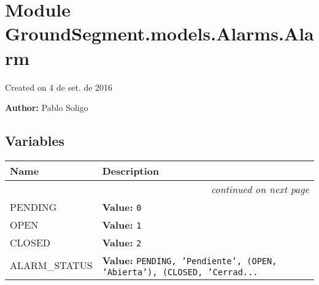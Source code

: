 %
%
%


\section{Module GroundSegment.models.Alarms.Alarm}

    \label{GroundSegment:models:Alarms:Alarm}
Created on 4 de set. de 2016

\textbf{Author:} Pablo Soligo





  \subsection{Variables}

    \vspace{-1cm}
\hspace{\varindent}\begin{longtable}{|p{\varnamewidth}|p{\vardescrwidth}|l}
\cline{1-2}
\cline{1-2} \centering \textbf{Name} & \centering \textbf{Description}& \\
\cline{1-2}
\endhead\cline{1-2}\multicolumn{3}{r}{\small\textit{continued on next page}}\\\endfoot\cline{1-2}
\endlastfoot\raggedright P\-E\-N\-D\-I\-N\-G\- & \raggedright \textbf{Value:} 
{\tt 0}&\\
\cline{1-2}
\raggedright O\-P\-E\-N\- & \raggedright \textbf{Value:} 
{\tt 1}&\\
\cline{1-2}
\raggedright C\-L\-O\-S\-E\-D\- & \raggedright \textbf{Value:} 
{\tt 2}&\\
\cline{1-2}
\raggedright A\-L\-A\-R\-M\-\_\-S\-T\-A\-T\-U\-S\- & \raggedright \textbf{Value:} 
{\tt PENDING, 'Pendiente', (OPEN, 'Abierta'), (CLOSED, 'Cerrad\texttt{...}}&\\
\cline{1-2}
\end{longtable}


